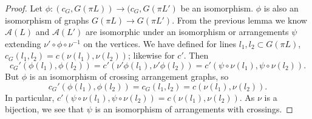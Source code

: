 \documentclass[11pt, oneside]{article}
\begin{document}
\begin{proof}
Let $\phi:(c_G, G(\pi L)) \to (c_G, G(\pi L')$ be an isomorphism. $\phi$ is also an isomorphism of graphs $G( \pi L) \to G( \pi L')$. 
From the previous lemma we know $\mathcal{A}(L)$ and $\mathcal{A}(L')$ are isomorphic under an isomorphism or arrangements $\psi$ extending $\nu' \circ \phi \circ \nu^{-1}$ on the vertices. 
We have defined for lines $l_1, l_2 \subset G( \pi L)$, $c_G(l_1, l_2) = c(\nu (l_1), \nu (l_2))$; likewise for $c'$. Then $$c_G'(\phi (l_1), \phi (l_2)) = c'(\nu' \phi (l_1), \nu' \phi (l_2)) = c' (\psi \circ \nu (l_1), \psi \circ \nu (l_2)).$$ 
But $\phi$ is an isomorphism of crossing arrangement graphs, so 
$$c_G'(\phi (l_1), \phi (l_2))= c_G(l_1, l_2) = c(\nu (l_1), \nu (l_2)).$$
In particular, $c' (\psi \circ \nu (l_1), \psi \circ \nu (l_2))= c(\nu (l_1), \nu (l_2))$. As $\nu$ is a bijection, we see that $\psi$ is an isomorphism of arrangements with crossings. \end{proof}
\end{document}
